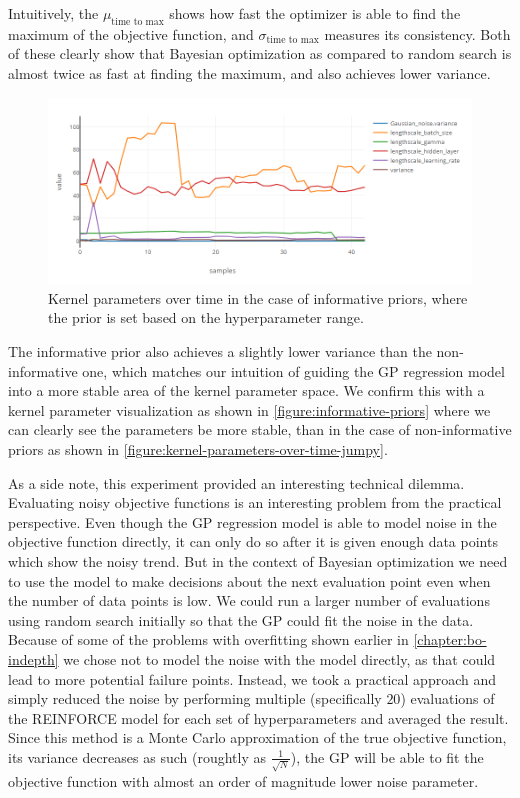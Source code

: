 Intuitively, the $\mu_{\text{time to max}}$ shows how fast the optimizer is able to find the maximum of the objective function, and $\sigma_{\text{time to max}}$ measures its consistency. Both of these clearly show that Bayesian optimization as compared to random search is almost twice as fast at finding the maximum, and also achieves lower variance.

\begin{figure}
	\begin{center}
		\includegraphics[width=1.0\textwidth]{images/informative-priors.png}
		\caption{Kernel parameters over time in the case of informative priors, where the prior is set based on the hyperparameter range.}
		\label{figure:informative-priors}
	\end{center}
\end{figure}


The informative prior also achieves a slightly lower variance than the non-informative one, which matches our intuition of guiding the GP regression model into a more stable area of the kernel parameter space. We confirm this with a kernel parameter visualization as shown in \autoref{figure:informative-priors} where we can clearly see the parameters be more stable, than in the case of non-informative priors as shown in \autoref{figure:kernel-parameters-over-time-jumpy}.

As a side note, this experiment provided an interesting technical dilemma. Evaluating noisy objective functions is an interesting problem from the practical perspective. Even though the GP regression model is able to model noise in the objective function directly, it can only do so after it is given enough data points which show the noisy trend. But in the context of Bayesian optimization we need to use the model to make decisions about the next evaluation point even when the number of data points is low. We could run a larger number of evaluations using random search initially so that the GP could fit the noise in the data. Because of some of the problems with overfitting shown earlier in \autoref{chapter:bo-indepth} we chose not to model the noise with the model directly, as that could lead to more potential failure points. Instead, we took a practical approach and simply reduced the noise by performing multiple (specifically $20$) evaluations of the REINFORCE model for each set of hyperparameters and averaged the result. Since this method is a Monte Carlo approximation of the true objective function, its variance decreases as such (roughtly as $\frac{1}{\sqrt{N}}$), the GP will be able to fit the objective function with almost an order of magnitude lower noise parameter.


